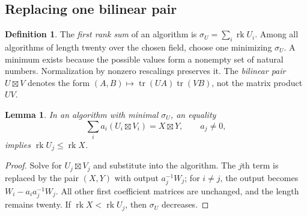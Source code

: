\documentclass[11pt,a4paper]{article}
\numberwithin{equation}{section}
\theoremstyle{plain}
\newtheorem{lemma}[theorem]{Lemma}
\theoremstyle{definition}
\newtheorem{definition}[theorem]{Definition}
\DeclareMathOperator{\tr}{tr}\DeclareMathOperator{\rk}{rk}
\newcommand{\leqs}{\leqslant}\newcommand{\geqs}{\geqslant}
\begin{document}
\subsection{Replacing one bilinear pair}

\begin{definition}
The \emph{first rank sum} of an algorithm is $\sigma_U=\sum_i\rk U_i$.
Among all algorithms of length twenty over the chosen field, choose
one minimizing $\sigma_U$. A minimum exists because the possible
values form a nonempty set of natural numbers. Normalization by
nonzero rescalings preserves it.
The \emph{bilinear pair} $U\boxtimes V$ denotes the form
$(A,B)\mapsto\tr(UA)\tr(VB)$, not the matrix product $UV$.
\end{definition}

\begin{lemma}\label{lem:exchange}
In an algorithm with minimal $\sigma_U$, an equality
\[
 \sum_i a_i(U_i\boxtimes V_i)=X\boxtimes Y,\qquad a_j\ne0,
\]
implies $\rk U_j\leqs\rk X$.
\end{lemma}
\begin{proof}
Solve for $U_j\boxtimes V_j$ and substitute into the algorithm.
The $j$th term is replaced by the pair $(X,Y)$ with output
$a_j^{-1}W_j$; for $i\ne j$, the output becomes
$W_i-a_i a_j^{-1}W_j$. All other first coefficient matrices are
unchanged, and the length remains twenty. If $\rk X<\rk U_j$,
then $\sigma_U$ decreases.
\end{proof}
\end{document}
